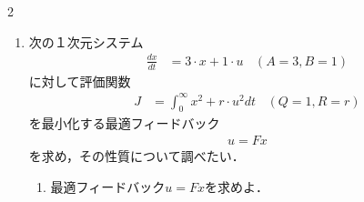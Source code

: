 

\pagestyle{fancy}
\fancyhf{}
\fancyfoot[C]{\thepage/\pageref{LastPage}}
\renewcommand{\headrulewidth}{0.4pt}
\renewcommand{\footrulewidth}{0pt}

\begin{multicols}{2}
\begin{enumerate}

\item
次の１次元システム
\begin{align}
	\frac{dx}{dt} &= 3 \cdot x + 1 \cdot u
	\ \ \ \  (A=3, B=1) 
\nonumber
\end{align}
に対して評価関数
\begin{align}
	J &= \int_0^\infty x^2 + r \cdot u^2 dt
	\ \ \ \  (Q=1, R=r)
\nonumber
\end{align}
を最小化する最適フィードバック
\begin{align}
	u=Fx
\nonumber
\end{align}
を求め，その性質について調べたい．

\begin{enumerate}
%
%
\item
最適フィードバック$u=Fx$を求めよ．
\vspace{11cm}


\end{enumerate}
\end{enumerate}
\end{multicols}
